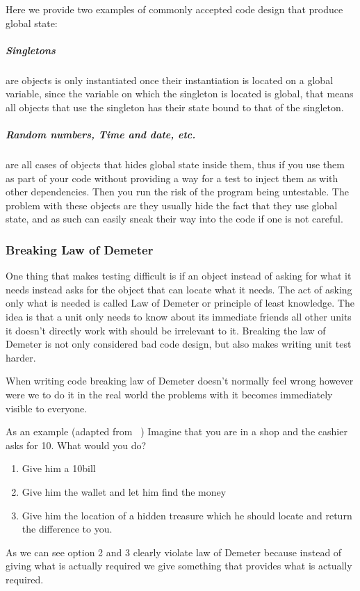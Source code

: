 Here we provide two examples of commonly accepted code design that
produce global state:


\subparagraph*{Singletons}

are objects is only instantiated once their instantiation is located
on a global variable, since the variable on which the singleton is
located is global, that means all objects that use the singleton has
their state bound to that of the singleton.


\subparagraph*{Random numbers, Time and date, etc.}

are all cases of objects that hides global state inside them, thus
if you use them as part of your code without providing a way for a
test to inject them as with other dependencies. Then you run the risk
of the program being untestable. The problem with these objects are
they usually hide the fact that they use global state, and as such
can easily sneak their way into the code if one is not careful. 


\subsubsection*{Breaking Law of Demeter}

One thing that makes testing difficult is if an object instead of
asking for what it needs instead asks for the object that can locate
what it needs. The act of asking only what is needed is called Law
of Demeter or principle of least knowledge. The idea is that a unit
only needs to know about its immediate friends all other units it
doesn\textquoteright{}t directly work with should be irrelevant to
it. Breaking the law of Demeter is not only considered bad code design,
but also makes writing unit test harder.

When writing code breaking law of Demeter doesn\textquoteright{}t
normally feel wrong however were we to do it in the real world the
problems with it becomes immediately visible to everyone.

As an example (adapted from ~\cite{WikiDemeter}) Imagine that you
are in a shop and the cashier asks for 10\texteuro. What would you
do?
\begin{enumerate}
\item Give him a 10\texteuro bill
\item Give him the wallet and let him find the money
\item Give him the location of a hidden treasure which he should locate
and return the difference to you.
\end{enumerate}
As we can see option 2 and 3 clearly violate law of Demeter because
instead of giving what is actually required we give something that
provides what is actually required.

